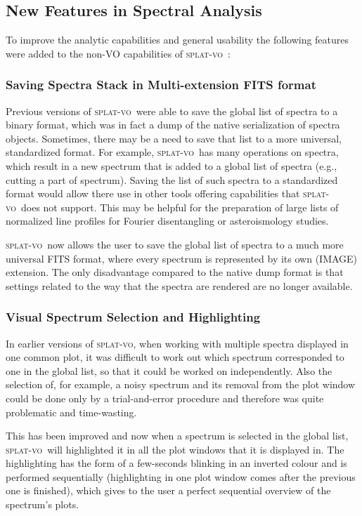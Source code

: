 \documentclass[final,authoryear,5p,times,twocolumn]{elsarticle}
\newcommand{\splatvo}{\textsc{splat-vo}}
\begin{document}
\subsection{New Features in Spectral Analysis}

\label{davids_functions}
To improve the analytic capabilities and general usability the following
features were added to the non-VO capabilities of \splatvo\ \citep{and146bcthesis}:

\subsubsection{Saving Spectra Stack in Multi-extension FITS format}

Previous versions of \splatvo\ were able to save the global list of spectra
to a binary format, which was in fact a dump of the native serialization of spectra
objects. Sometimes, there may be a need to save that list to a more
universal, standardized format. For example, \splatvo\ has many
operations on spectra, which result in a new spectrum that is added to
a global list of spectra (e.g., cutting a part of spectrum). Saving the list of
such spectra to a standardized format would allow there use in other
tools offering capabilities that \splatvo\ does not support.
This may be helpful for the preparation of large lists of normalized line profiles
for Fourier disentangling or asteroismology studies.

\splatvo\ now allows the user to save the global list of spectra to a
much more universal FITS format, where every spectrum  is represented by its
own (IMAGE) extension.  The only disadvantage compared to the native dump
format is that settings related to the way that the spectra are rendered are
no longer available.
\subsubsection{Visual Spectrum Selection and Highlighting}

In earlier versions of \splatvo, when working with multiple spectra displayed
in one common plot, it was difficult to work out which spectrum corresponded
to one in the global list, so that it could be worked on independently.
Also the selection of, for example, a noisy spectrum and its removal from
the plot window could be done only by a trial-and-error procedure and therefore
was quite problematic and time-wasting.

This has been improved and now when a spectrum is selected in the global
list, \splatvo\ will highlighted it in all the plot windows that it is displayed in.
The highlighting has the form of a few-seconds blinking in an inverted colour
and is performed sequentially (highlighting in one plot window comes after the
previous one is finished), which gives to the user a perfect sequential overview
of the spectrum's plots.
\end{document}

